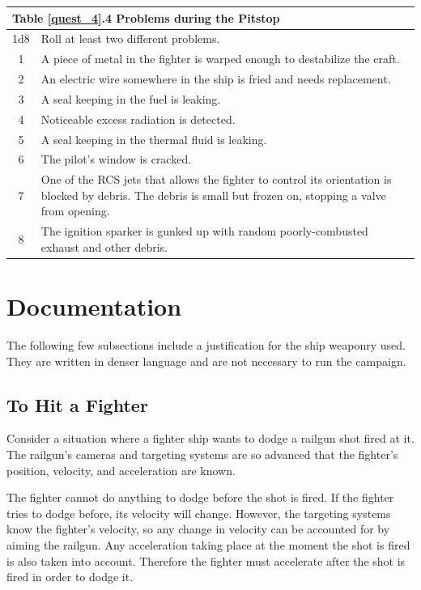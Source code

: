\documentclass[a4paper]{article}
\begin{document}
\vspace{0.2cm}
\begin{tabular}[t]{| c | p{12.5cm} |}
\toprule
\multicolumn{2}{|l|}{Table \ref{quest_4}.4 Problems during the Pitstop} \\
\midrule
1d8 & Roll at least two different problems. \\
\midrule
1 & A piece of metal in the fighter is warped enough to destabilize the craft. \\
2 & An electric wire somewhere in the ship is fried and needs replacement. \\ 
3 & A seal keeping in the fuel is leaking. \\ 
4 & Noticeable excess radiation is detected. \\
5 & A seal keeping in the thermal fluid is leaking. \\ 
6 & The pilot's window is cracked. \\
7 & One of the RCS jets that allows the fighter to control its orientation is blocked by debris. The debris is small but frozen on, stopping a valve from opening. \\
8 & The ignition sparker is gunked up with random poorly-combusted exhaust and other debris. \\
\bottomrule
\end{tabular}


\newpage
\section{Documentation}

The following few subsections include a justification for the ship weaponry used. They are written in denser language and are not necessary to run the campaign.

\subsection{To Hit a Fighter}

Consider a situation where a fighter ship wants to dodge a railgun shot fired at it. The railgun's cameras and targeting systems are so advanced that the fighter's position, velocity, and acceleration are known. 

The fighter cannot do anything to dodge before the shot is fired. If the fighter tries to dodge before, its velocity will change. However, the targeting systems know the fighter's velocity, so any change in velocity can be accounted for by aiming the railgun. Any acceleration taking place at the moment the shot is fired is also taken into account. Therefore the fighter must accelerate after the shot is fired in order to dodge it.
\end{document}
